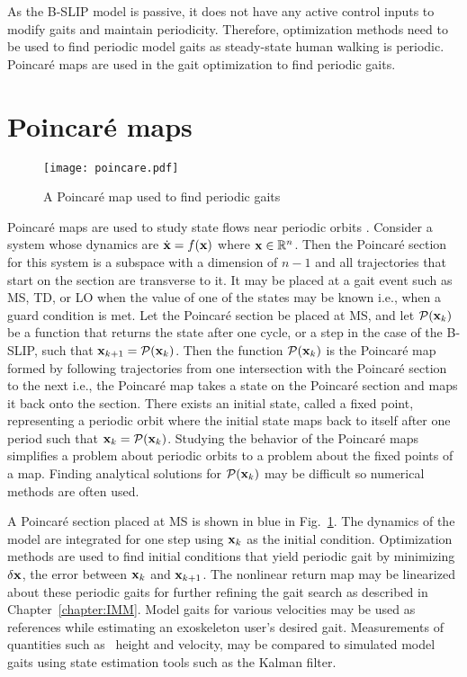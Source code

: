 As the B-SLIP model is passive, it does not have any active control inputs to modify gaits and maintain periodicity. Therefore, optimization methods need to be used to find periodic model gaits as steady-state human walking is periodic. Poincar\'e maps are used in the gait optimization \cite{strogatz2018nonlinear,garcia1998simplest} to find periodic gaits.

\section{Poincar\'e maps}

\begin{figure}
	\centering
	\texttt{[image: poincare.pdf]}
	\caption{A Poincar\'e map used to find periodic gaits}\label{fig:poincare}
\end{figure}

Poincar\'e maps are used to study state flows near periodic orbits \cite{strogatz2018nonlinear}. Consider a system whose dynamics are $ \dot{\mathbf{x}} = f(\mathbf{x}) $ where $ \mathbf{x} \in \mathbb{R}^n $. Then the  Poincar\'e section for this system is a subspace with a dimension of $ n-1 $ and all trajectories that start on the section are transverse to it. It may be placed at a gait event such as MS, TD, or LO when the value of one of the states may be known i.e., when a guard condition is met. Let the Poincar\'e section be placed at MS, and let $ \mathcal{P}(\mathbf{x}_k) $ be a function that returns the state after one cycle, or a step in the case of the B-SLIP, such that $ \mathbf{x}_{k+1} = \mathcal{P}(\mathbf{x}_k) $. Then the function $ \mathcal{P}(\mathbf{x}_k) $ is the Poincar\'e map formed by following trajectories from one intersection with the Poincar\'e section to the next i.e., the Poincar\'e map takes a state on the Poincar\'e section and maps it back onto the section. There exists an initial state, called a fixed point, representing a periodic orbit where the initial state maps back to itself after one period such that $ \mathbf{x}_k = \mathcal{P}(\mathbf{x}_k) $. Studying the behavior of the Poincar\'e maps simplifies a problem about periodic orbits to a problem about the fixed points of a map. Finding analytical solutions for $ \mathcal{P}(\mathbf{x}_k) $ may be difficult so numerical methods are often used. 
%
%

A Poincar\'e section placed at MS is shown in blue in Fig.~\ref{fig:poincare}. The dynamics of the model are integrated for one step using $ \mathbf{x}_k $ as the initial condition. Optimization methods are used to find initial conditions that yield periodic gait by minimizing $ \delta \mathbf{x} $, the error between $ \mathbf{x}_k $ and $ \mathbf{x}_{k+1} $. The nonlinear return map may be linearized about these periodic gaits for further refining the gait search as described in Chapter~\ref{chapter:IMM}. Model gaits for various velocities may be used as references while estimating an exoskeleton user's desired gait. Measurements of quantities such as \COM~height and velocity, may be compared to simulated model gaits using state estimation tools such as the Kalman filter. 


